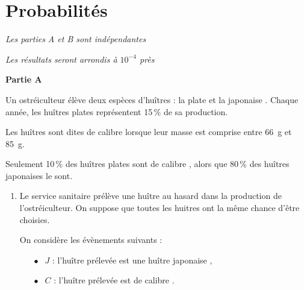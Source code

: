 \documentclass{cornouaille}
\begin{document}

\tableofcontents

\section{Probabilités}
\begin{exercice}


\emph{Les parties A et B sont indépendantes}

\medskip
 
\emph{Les résultats seront arrondis à $10^{-4}$ près}

\medskip
 
\textbf{Partie A}

\medskip
 
Un ostréiculteur élève deux espèces d'huîtres : \og la plate \fg{} et \og la japonaise \fg. Chaque année, les huîtres plates représentent 15\,\% de sa production.
 
Les huîtres sont dites de calibre  lorsque leur masse est comprise entre 66~g et 85~g.
 
Seulement 10\,\% des huîtres plates sont de calibre , alors que 80\,\% des huîtres japonaises le sont.

\medskip
 
\begin{enumerate}
\item Le service sanitaire prélève une huître au hasard dans la production de l'ostréiculteur. On suppose que toutes les huitres ont la même chance d'être choisies.
 
On considère les évènements suivants : 

\setlength\parindent{8mm}
\begin{itemize}
\item[$\bullet~~$] $J$ : \og l'huître prélevée est une huître japonaise \fg, 
\item[$\bullet~~$] $C$ : \og l'huître prélevée est de calibre  \fg.
\end{itemize}
\setlength\parindent{0mm}
 

\end{enumerate}
\end{exercice}
\end{document}
